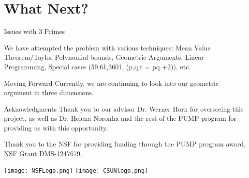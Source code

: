\documentclass{beamer}
\begin{document}
\section{What Next?}
\begin{frame}{Issues with 3 Primes}

    We have attempted the problem with various techniques: Mean Value Theorem/Taylor Polynomial bounds, Geometric Arguments, Linear Programming, Special cases (59,61,3601, (p,q,r = pq +2)), etc.
    
\end{frame}
\begin{frame}{Moving Forward}
Currently, we are continuing to look into our geometric argument in three dimensions. 
\end{frame}
\begin{frame}{Acknowledgments}
    Thank you to our advisor Dr. Werner Horn for overseeing this project, as well as Dr. Helena Noronha and the rest of the PUMP program for providing us with this opportunity. \vspace{.1in}
        
    Thank you to the NSF for providing funding through the  PUMP program award, NSF Grant DMS-1247679.
    
    \begin{center}
        \texttt{[image: NSFLogo.png]}
        \texttt{[image: CSUNlogo.png]}
    \end{center}
\end{frame}
\end{document}
